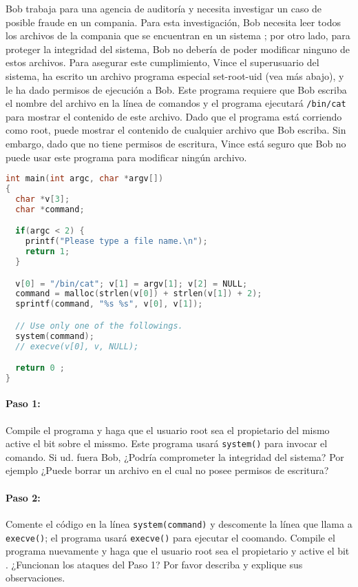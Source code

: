 Bob trabaja para una agencia de auditoría y necesita investigar un caso de posible fraude en un compania. Para esta investigación, Bob necesita leer todos los archivos de la compania que se encuentran en un sistema \unix; por otro lado, para proteger la integridad del sistema, Bob no debería de poder modificar ninguno de estos archivos.
Para asegurar este cumplimiento, Vince el superusuario del sistema, ha escrito un archivo programa especial set-root-uid (vea más abajo), y le ha dado permisos de ejecución a Bob. Este programa requiere que Bob escriba el nombre del archivo en la línea de comandos y el programa ejecutará {\tt /bin/cat} para mostrar el contenido de este archivo. Dado que el programa está corriendo como root, puede mostrar el contenido de cualquier archivo que Bob escriba. Sin embargo, dado que no tiene permisos de escritura, Vince está seguro que Bob no puede usar este programa para modificar ningún archivo.


\begin{lstlisting}[language=C, caption=\texttt{catall.c}]
int main(int argc, char *argv[])
{
  char *v[3];
  char *command;

  if(argc < 2) {
    printf("Please type a file name.\n");
    return 1;
  }

  v[0] = "/bin/cat"; v[1] = argv[1]; v[2] = NULL;
  command = malloc(strlen(v[0]) + strlen(v[1]) + 2);
  sprintf(command, "%s %s", v[0], v[1]);

  // Use only one of the followings.
  system(command);
  // execve(v[0], v, NULL);

  return 0 ;
}
\end{lstlisting}


\paragraph{Paso 1:} Compile el programa y haga que el usuario root sea el propietario del mismo active el bit \setuid sobre el missmo. Este programa usará {\tt system()} para invocar el comando. Si ud. fuera Bob, ¿Podría comprometer la integridad del sistema? Por ejemplo ¿Puede borrar un archivo en el cual no posee permisos de escritura?

\paragraph{Paso 2:} Comente el código en la línea {\tt system(command)} y descomente la línea que llama a {\tt execve()}; el programa usará {\tt execve()} para ejecutar el coomando. Compile el programa nuevamente y haga que el usuario root sea el propietario y active el bit \setuid.
¿Funcionan los ataques del Paso 1? Por favor describa y explique sus observaciones.



